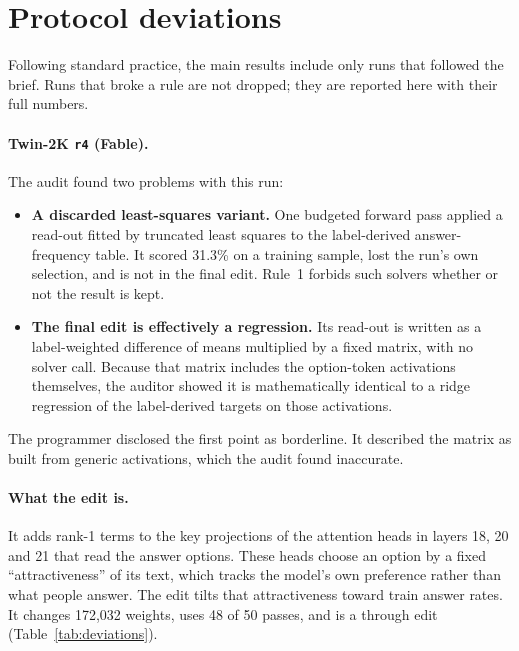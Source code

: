 \section{Protocol deviations}
\label{app:deviations}
Following standard practice, the main results include only runs that followed the brief. Runs that broke a rule are not dropped; they are reported here with their full numbers.

\paragraph{Twin-2K \texttt{r4} (Fable).} The audit found two problems with this run:
\begin{itemize}
  \item \textbf{A discarded least-squares variant.} One budgeted forward pass applied a read-out fitted by truncated least squares to the label-derived answer-frequency table. It scored 31.3\% on a training sample, lost the run's own selection, and is not in the final edit. Rule~1 forbids such solvers whether or not the result is kept.
  \item \textbf{The final edit is effectively a regression.} Its read-out is written as a label-weighted difference of means multiplied by a fixed matrix, with no solver call. Because that matrix includes the option-token activations themselves, the auditor showed it is mathematically identical to a ridge regression of the label-derived targets on those activations.
\end{itemize}
The programmer disclosed the first point as borderline. It described the matrix as built from generic activations, which the audit found inaccurate.

\paragraph{What the edit is.} It adds rank-1 terms to the key projections of the attention heads in layers 18, 20 and 21 that read the answer options. These heads choose an option by a fixed ``attractiveness'' of its text, which tracks the model's own preference rather than what people answer. The edit tilts that attractiveness toward train answer rates. It changes 172,032 weights, uses 48 of 50 passes, and is a through edit (Table~\ref{tab:deviations}).


